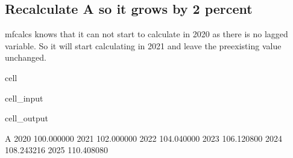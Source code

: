 \documentclass[letterpaper,10pt,english]{jupyterBook}
\begin{document}
\subsection{Recalculate A so  it grows by 2 percent}
\label{\detokenize{content/04_PythonEssentials/ExtendingDataFrames:recalculate-a-so-it-grows-by-2-percent}}
\sphinxAtStartPar
mfcalcs knows that it can not start to calculate in 2020 as there is no lagged variable. So it will start calculating in 2021 and leave the pre\sphinxhyphen{}existing value unchanged.

\begin{sphinxuseclass}{cell}\begin{sphinxVerbatimInput}

\begin{sphinxuseclass}{cell_input}
\begin{sphinxVerbatim}[commandchars=\\\{\}]
  
\end{sphinxVerbatim}

\end{sphinxuseclass}\end{sphinxVerbatimInput}
\begin{sphinxVerbatimOutput}

\begin{sphinxuseclass}{cell_output}
\begin{sphinxVerbatim}[commandchars=\\\{\}]
               A
2020  100.000000
2021  102.000000
2022  104.040000
2023  106.120800
2024  108.243216
2025  110.408080
\end{sphinxVerbatim}

\end{sphinxuseclass}\end{sphinxVerbatimOutput}

\end{sphinxuseclass}
\end{document}
